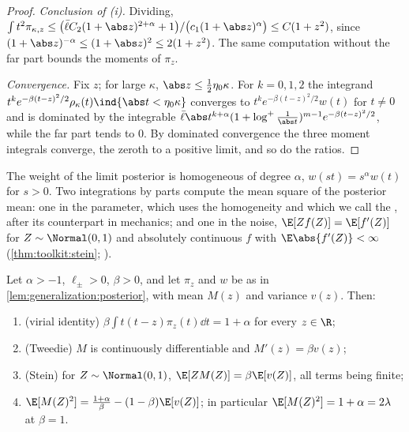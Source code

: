 \begin{refsection}
\begin{proof}
\emph{Conclusion of (i).} Dividing, $\int t^2\pi_{\kappa,z}\le\bigl(\bar\ell C_2(1+\abs z)^{2+\alpha}+1\bigr)/\bigl(c_1(1+\abs z)^\alpha\bigr)\le C(1+z^2)$, since $(1+\abs z)^{-\alpha}\le(1+\abs z)^2\le2(1+z^2)$. The same computation without the far part bounds the moments of $\pi_z$.

\emph{Convergence.} Fix $z$; for large $\kappa$, $\abs z\le\frac12\eta_0\kappa$. For $k=0,1,2$ the integrand $t^ke^{-\beta(t-z)^2/2}\rho_\kappa(t)\ind\{\abs t<\eta_0\kappa\}$ converges to $t^ke^{-\beta(t-z)^2/2}w(t)$ for $t\ne0$ and is dominated by the integrable $\bar\ell\abs t^{k+\alpha}(1+\log^+\frac1{\abs t})^{m-1}e^{-\beta(t-z)^2/2}$, while the far part tends to $0$. By dominated convergence the three moment integrals converge, the zeroth to a positive limit, and so do the ratios.
\end{proof}

The weight of the limit posterior is homogeneous of degree $\alpha$, $w(st)=s^\alpha w(t)$ for $s>0$. Two integrations by parts compute the mean square of the posterior mean: one in the parameter, which uses the homogeneity and which we call the , after its counterpart in mechanics; and one in the noise,  $\E[Zf(Z)]=\E[f'(Z)]$ for $Z\sim\Normal(0,1)$ and absolutely continuous $f$ with $\E\abs{f'(Z)}<\infty$ (\cref{thm:toolkit:stein}; \textcite{Stein1981}).

\begin{lemma}\label{lem:generalization:parts}
Let $\alpha>-1$, $\ell_\pm>0$, $\beta>0$, and let $\pi_z$ and $w$ be as in \cref{lem:generalization:posterior}, with mean $M(z)$ and variance $v(z)$. Then:
\begin{enumerate}[label=(\roman*),nosep]
\item (virial identity) $\beta\int t(t-z)\pi_z(t)\dd t=1+\alpha$ for every $z\in\R$;
\item (Tweedie) $M$ is continuously differentiable and $M'(z)=\beta v(z)$;
\item (Stein) for $Z\sim\Normal(0,1)$, $\E[ZM(Z)]=\beta\E[v(Z)]$, all terms being finite;
\item $\E[M(Z)^2]=\frac{1+\alpha}\beta-(1-\beta)\E[v(Z)]$; in particular $\E[M(Z)^2]=1+\alpha=2\lambda$ at $\beta=1$.
\end{enumerate}
\end{lemma}


\end{refsection}
